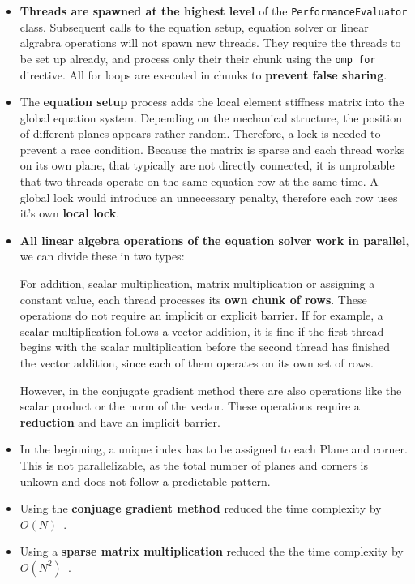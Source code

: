 \documentclass[12pt]{article}
\begin{document}
\begin{itemize}
    \item \textbf{Threads are spawned at the highest level} of the \texttt{PerformanceEvaluator} class. Subsequent calls to the equation setup, equation solver or linear algrabra operations will not spawn new threads. They require the threads to be set up already, and process only their their chunk using the \texttt{omp for} directive. All for loops are executed in chunks to \textbf{prevent false sharing}.
    \item The \textbf{equation setup} process adds the local element stiffness matrix into the global equation system. Depending on the mechanical structure, the position of different planes appears rather random. Therefore, a lock is needed to prevent a race condition. Because the matrix is sparse and each thread works on its own plane, that typically are not directly connected, it is unprobable that two threads operate on the same equation row at the same time. A global lock would introduce an unnecessary penalty, therefore each row uses it's own \textbf{local lock}.
    \item \textbf{All linear algebra operations of the equation solver work in parallel}, we can divide these in two types:
    
    For addition, scalar multiplication, matrix multiplication or assigning a constant value, each thread processes its \textbf{own chunk of rows}. These operations do not require an implicit or explicit barrier. If for example, a scalar multiplication follows a vector addition, it is fine if the first thread begins with the scalar multiplication before the second thread has finished the vector addition, since each of them operates on its own set of rows.
    
    However, in the conjugate gradient method there are also operations like the scalar product or the norm of the vector. These operations require a \textbf{reduction} and have an implicit barrier.
    \item In the beginning, a unique index has to be assigned to each Plane and corner. This is not parallelizable, as the total number of planes and corners is unkown and does not follow a predictable pattern.
    \item Using the \textbf{conjuage gradient method} reduced the time complexity by $O(N)$~\cite{ProgressReport}.
    \item Using a \textbf{sparse matrix multiplication} reduced the the time complexity by $O(N^2)$~\cite{ProgressReport}. 
\end{itemize}
\end{document}
